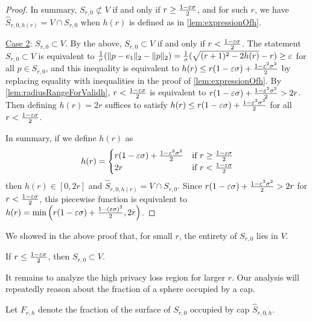 \begin{proof}
    In summary, $S_{r,0} \not\subset V$ if and only if $r \geq \frac{1-\varepsilon\sigma}{2}$, and for such $r$, we have $\hat S_{r, 0, h(r)} = V \cap S_{r, 0}$ when $h(r)$ is defined as in \cref{lem:expressionOfh}.
    
    \underline{Case 2}: $S_{r,0} \subset V$. By the above, $S_{r,0} \subset V$ if and only if $r < \frac{1-\varepsilon\sigma}{2}$. The statement $S_{r,0} \subset V$ is equivalent to $\frac{1}{\sigma}(\|p - e_1\|_2 - \|p\|_2) = \frac{1}{\sigma}(\sqrt{(r+1)^2 - 2h(r)} - r) \geq \varepsilon$ for all $p \in S_{r,0}$, and this inequality is equivalent to $h(r) \leq r(1-\varepsilon \sigma)  + \frac{1 - \varepsilon^2\sigma^2}{2}$ by replacing equality with inequalities in the proof of \cref{lem:expressionOfh}. By \cref{lem:radiusRangeForValidh}, $r < \frac{1-\varepsilon\sigma}{2}$ is equivalent to $r(1-\varepsilon \sigma) + \frac{1- \varepsilon^2 \sigma^2}{2} > 2r$. Then defining $h(r) = 2r$ suffices to satisfy $h(r) \leq r(1-\varepsilon \sigma)  + \frac{1 - \varepsilon^2\sigma^2}{2}$ for all $r < \frac{1-\varepsilon\sigma}{2}$.
    
    In summary, if we define $h(r)$ as
    \[ h(r) = \begin{cases} 
          r(1-\varepsilon \sigma)  + \frac{1 - \varepsilon^2\sigma^2}{2} & \text{if } r \geq \frac{1-\varepsilon\sigma}{2} \\
          2r & \text{if } r < \frac{1-\varepsilon\sigma}{2} \\
       \end{cases}
    \] 
    then $h(r) \in [0, 2r]$ and $\hat S_{r, 0, h(r)} = V \cap S_{r, 0}$. Since $r(1-\varepsilon \sigma)  + \frac{1 - \varepsilon^2\sigma^2}{2} > 2r$ for $r < \frac{1-\varepsilon\sigma}{2}$, this piecewise function is equivalent to $h(r) = \min\left(r(1-\varepsilon\sigma) + \frac{1 - (\varepsilon\sigma)^2}{2}, 2r\right)$.
\end{proof}

We showed in the above proof that, for small $r$, the entirety of $S_{r,0}$ lies in $V$.
\begin{corollary}
\label{cor:small_r_high_loss}
    If $r \leq \frac{1-\varepsilon \sigma}{2}$, then $S_{r,0} \subset V$.
\end{corollary}

It remains to analyze the high privacy loss region for larger $r$. Our analysis will repeatedly reason about the fraction of a sphere occupied by a cap.

\begin{definition}
\label{def:F}
    Let $F_{r,h}$ denote the fraction of the surface of $S_{r,0}$ occupied by cap $\hat S_{r,0,h}$.
\end{definition}

